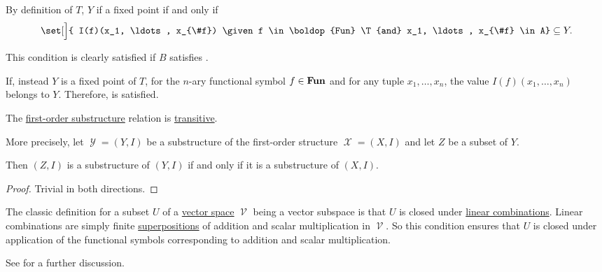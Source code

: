 \begin{defproof}
   By definition of \( T \), \( Y \) if a fixed point if and only if
  \begin{equation*}
    \set[\Big]{ I(f)(x_1, \ldots, x_{\#f}) \given f \in \boldop{Fun} \T{and} x_1, \ldots, x_{\#f} \in A} \subseteq Y.
  \end{equation*}

  This condition is clearly satisfied if \( B \) satisfies .

   If, instead \( Y \) is a fixed point of \( T \), for the \( n \)-ary functional symbol \( f \in \operatorname{\mathbf{Fun}} \) and for any tuple \( x_1, \ldots, x_n \), the value \( I(f)(x_1, \ldots, x_n) \) belongs to \( Y \). Therefore,  is satisfied.
\end{defproof}

\begin{proposition}\label{thm:substructure_relation_is_transitive}
  The \hyperref[def:first_order_substructure]{first-order substructure} relation is \hyperref[def:binary_relation/transitive]{transitive}.

  More precisely, let \( \mscrY = (Y, I) \) be a substructure of the first-order structure \( \mscrX = (X, I) \) and let \( Z \) be a subset of \( Y \).

  Then \( (Z, I) \) is a substructure of \( (Y, I) \) if and only if it is a substructure of \( (X, I) \).
\end{proposition}
\begin{proof}
  Trivial in both directions.
\end{proof}

\begin{example}\label{ex:def:first_order_substructure/vector_space}
  The classic definition for a subset \( U \) of a \hyperref[def:vector_space]{vector space} \( \mscrV \) being a vector subspace is that \( U \) is closed under \hyperref[rem:linear_combinations]{linear combinations}. Linear combinations are simply finite \hyperref[rem:function_superposition]{superpositions} of addition and scalar multiplication in \( \mscrV \). So this condition ensures that \( U \) is closed under application of the functional symbols corresponding to addition and scalar multiplication.

  See  for a further discussion.
\end{example}

